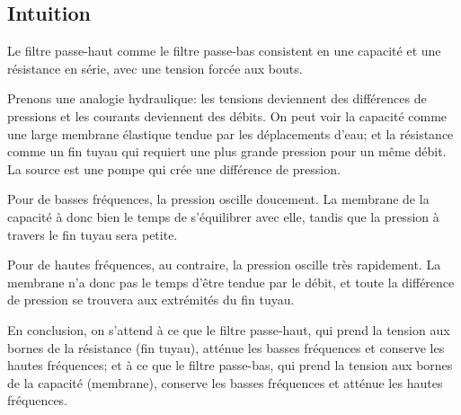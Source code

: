 \subsection{Intuition}
\label{subsec:filtres/mode/intuition}

Le filtre passe-haut comme le filtre passe-bas
consistent en une capacité et une résistance en série,
avec une tension forcée aux bouts.

Prenons une analogie hydraulique:
les tensions deviennent des différences de pressions
et les courants deviennent des débits.
On peut voir la capacité comme une large membrane élastique
tendue par les déplacements d'eau;
et la résistance comme un fin tuyau
qui requiert une plus grande pression pour un même débit.
La source est une pompe qui crée une différence de pression.

Pour de basses fréquences, la pression oscille doucement.
La membrane de la capacité à donc bien le temps de s'équilibrer avec elle,
tandis que la pression à travers le fin tuyau sera petite.

Pour de hautes fréquences, au contraire,
la pression oscille très rapidement.
La membrane n'a donc pas le temps d'être tendue par le débit,
et toute la différence de pression
se trouvera aux extrémités du fin tuyau.

En conclusion, on s'attend à ce que le filtre passe-haut,
qui prend la tension aux bornes de la résistance (fin tuyau),
atténue les basses fréquences et conserve les hautes fréquences;
et à ce que le filtre passe-bas,
qui prend la tension aux bornes de la capacité (membrane),
conserve les basses fréquences et atténue les hautes fréquences.
